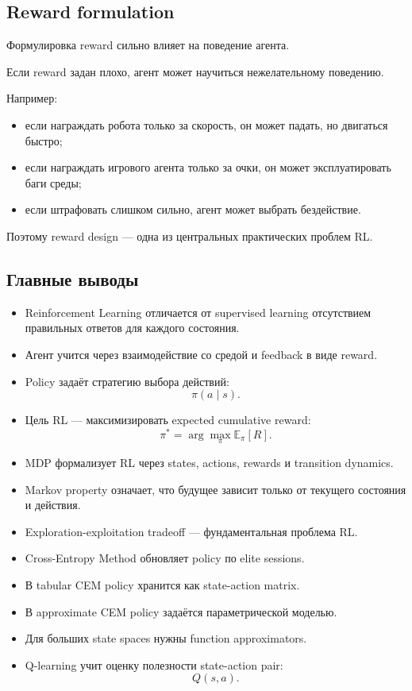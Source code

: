\documentclass[a4paper,12pt]{article}
\begin{document}
\subsection{Reward formulation}

Формулировка reward сильно влияет на поведение агента.

Если reward задан плохо, агент может научиться нежелательному поведению.

Например:

\begin{itemize}
    \item если награждать робота только за скорость, он может падать, но двигаться быстро;
    \item если награждать игрового агента только за очки, он может эксплуатировать баги среды;
    \item если штрафовать слишком сильно, агент может выбрать бездействие.
\end{itemize}

Поэтому reward design --- одна из центральных практических проблем RL.

\subsection{Главные выводы}

\begin{itemize}
    \item Reinforcement Learning отличается от supervised learning отсутствием правильных ответов для каждого состояния.
    \item Агент учится через взаимодействие со средой и feedback в виде reward.
    \item Policy задаёт стратегию выбора действий:
    \[
    \pi(a \mid s).
    \]

    \item Цель RL --- максимизировать expected cumulative reward:
    \[
    \pi^*
    =
    \arg\max_\pi
    \mathbb{E}_\pi[R].
    \]

    \item MDP формализует RL через states, actions, rewards и transition dynamics.
    \item Markov property означает, что будущее зависит только от текущего состояния и действия.
    \item Exploration-exploitation tradeoff --- фундаментальная проблема RL.
    \item Cross-Entropy Method обновляет policy по elite sessions.
    \item В tabular CEM policy хранится как state-action matrix.
    \item В approximate CEM policy задаётся параметрической моделью.
    \item Для больших state spaces нужны function approximators.
    \item Q-learning учит оценку полезности state-action pair:
    \[
    Q(s,a).
    \]
\end{itemize}
\end{document}
